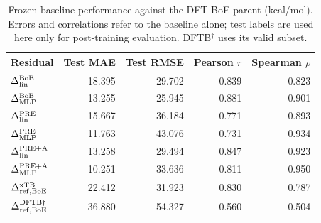 \begin{table}[H]
\centering
\scriptsize
\setlength{\tabcolsep}{4pt}
\renewcommand{\arraystretch}{1.35}
\caption{Frozen baseline performance against the DFT-BoE parent (kcal/mol). Errors and correlations refer to the baseline alone; test labels are used here only for post-training evaluation. DFTB$^\dagger$ uses its valid subset.}
\begin{tabular}{lrrrr}
\toprule
Residual & Test MAE & Test RMSE & Pearson $r$ & Spearman $\rho$ \\
\midrule
\(\Delta^{\rm BoB}_{\rm lin}\) & 18.395 & 29.702 & 0.839 & 0.823 \\
\(\Delta^{\rm BoB}_{\rm MLP}\) & 13.255 & 25.945 & 0.881 & 0.901 \\
\(\Delta^{\rm PRE}_{\rm lin}\) & 15.667 & 36.184 & 0.771 & 0.893 \\
\(\Delta^{\rm PRE}_{\rm MLP}\) & 11.763 & 43.076 & 0.731 & 0.934 \\
\(\Delta^{\rm PRE+A}_{\rm lin}\) & 13.258 & 29.494 & 0.847 & 0.923 \\
\(\Delta^{\rm PRE+A}_{\rm MLP}\) & 10.251 & 33.636 & 0.811 & 0.950 \\
\(\Delta^{\rm xTB}_{\rm ref,BoE}\) & 22.412 & 31.923 & 0.830 & 0.787 \\
\(\Delta^{\rm DFTB\dagger}_{\rm ref,BoE}\) & 36.880 & 54.327 & 0.560 & 0.504 \\
\bottomrule
\end{tabular}
\end{table}
